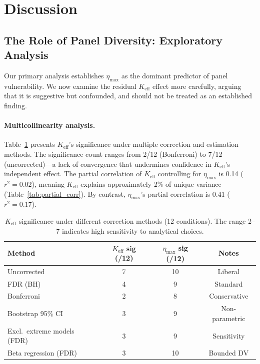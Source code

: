 \documentclass[11pt,a4paper]{article}
\begin{document}
\section{Discussion}
\label{sec:discussion}

\subsection{The Role of Panel Diversity: Exploratory Analysis}
\label{sec:keff_discuss}

Our primary analysis establishes $\eta_{\max}$ as the dominant predictor of panel vulnerability.
We now examine the residual $K_{\mathrm{eff}}$ effect more carefully, arguing that it is suggestive but confounded, and should not be treated as an established finding.

\paragraph{Multicollinearity analysis.}
Table~\ref{tab:multicollinearity} presents $K_{\mathrm{eff}}$'s significance under multiple correction and estimation methods.
The significance count ranges from 2/12 (Bonferroni) to 7/12 (uncorrected)---a lack of convergence that undermines confidence in $K_{\mathrm{eff}}$'s independent effect.
The partial correlation of $K_{\mathrm{eff}}$ controlling for $\eta_{\max}$ is 0.14 ($r^2 = 0.02$), meaning $K_{\mathrm{eff}}$ explains approximately 2\% of unique variance (Table~\ref{tab:partial_corr}).
By contrast, $\eta_{\max}$'s partial correlation is 0.41 ($r^2 = 0.17$).

\begin{table}[t]
\centering
\caption{$K_{\mathrm{eff}}$ significance under different correction methods (12 conditions). The range 2--7 indicates high sensitivity to analytical choices.}
\label{tab:multicollinearity}
\small
\begin{tabular}{lccc}
\toprule
\textbf{Method} & $K_{\mathrm{eff}}$ \textbf{sig (/12)} & $\eta_{\max}$ \textbf{sig (/12)} & \textbf{Notes} \\
\midrule
Uncorrected & 7 & 10 & Liberal \\
FDR (BH) & 4 & 9 & Standard \\
Bonferroni & 2 & 8 & Conservative \\
Bootstrap 95\% CI & 3 & 9 & Non-parametric \\
Excl.\ extreme models (FDR) & 3 & 9 & Sensitivity \\
Beta regression (FDR) & 3 & 10 & Bounded DV \\
\bottomrule
\end{tabular}
\end{table}
\end{document}
